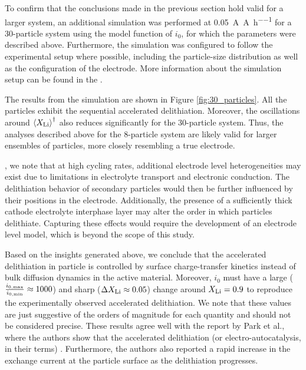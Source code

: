 \documentclass{article}
\begin{document}

To confirm that the conclusions made in the previous section hold
valid for a larger system, an additional simulation was performed at
\SI{0.05}{\ampere\per\ampere\per\hour} for a 30-particle system using
the model function of $i_0$, for which the parameters were described
above. Furthermore, the simulation was configured to follow the
experimental setup where possible, including the particle-size
distribution as well as the configuration of the electrode. More
information about the simulation setup can be found in the .

The results from the simulation are shown in Figure
\ref{fig:30_particles}. All the particles exhibit the sequential
accelerated delithiation. Moreover, the oscillations around
$\left<X_{\rm{Li}}\right>^\dagger$ also reduces significantly for the
30-particle system. Thus, the analyses described above for the
8-particle system are likely valid for larger ensembles of particles,
more closely resembling a true electrode.

, we note that at high cycling rates, additional
electrode level heterogeneities may exist due to limitations in
electrolyte transport \cite{dasgupta2020} and electronic
conduction\cite{liu2019-2}. The delithiation behavior of secondary
particles would then be further influenced by their positions in the
electrode. Additionally, the presence of a sufficiently thick cathode
electrolyte interphase layer may alter the order in which particles
delithiate. Capturing these effects would require the development of
an electrode level model, which is beyond the scope of this study.


Based on the insights generated above, we conclude that the
accelerated delithiation in \nca{} particle is controlled by surface
charge-transfer kinetics instead of bulk  diffusion dynamics
in the active material. Moreover, $i_0$ must have a large ($\frac{
  i_{0,\rm{max}} }{ i_{0,\rm{min}} } \approx 1000$) and sharp ($\Delta
X_{\rm{Li}} \approx 0.05$) change around $X_{\rm{Li}} = 0.9$ to
reproduce the experimentally observed accelerated delithiation. We
note that these values are just suggestive of the orders of magnitude
for each quantity and should not be considered precise. These results
agree well with the report by Park et al.\cite{chueh2021}, where the
authors show that the accelerated delithiation (or
electro-autocatalysis, in their terms) . Furthermore, the
authors also reported a rapid increase in the exchange current at the
\nca{} particle surface as the delithiation progresses.
\end{document}
